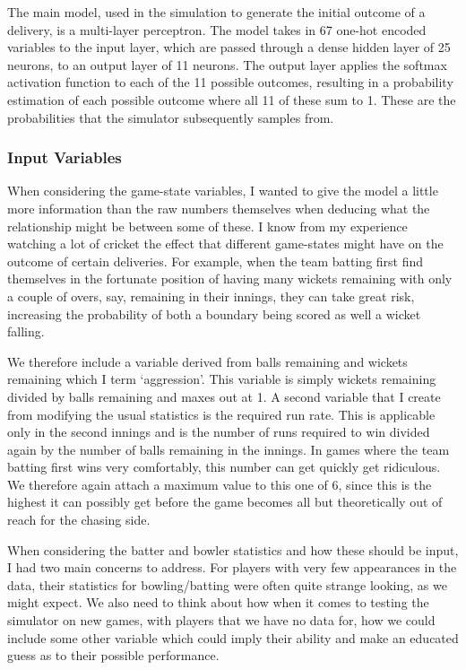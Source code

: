 The main model, used in the simulation to generate the initial outcome of a delivery, is a multi-layer perceptron. The model takes in 67 one-hot encoded variables to the input layer, which are passed through a dense hidden layer of 25 neurons, to an output layer of 11 neurons. The output layer applies the softmax activation function to each of the 11 possible outcomes, resulting in a probability estimation of each possible outcome where all 11 of these sum to 1. These are the probabilities that the simulator subsequently samples from.

\subsubsection{Input Variables}

When considering the game-state variables, I wanted to give the model a little more information than the raw numbers themselves when deducing what the relationship might be between some of these. I know from my experience watching a lot of cricket the effect that different game-states might have on the outcome of certain deliveries. For example, when the team batting first find themselves in the fortunate position of having many wickets remaining with only a couple of overs, say, remaining in their innings, they can take great risk, increasing the probability of both a boundary being scored as well a wicket falling.

We therefore include a variable derived from balls remaining and wickets remaining which I term `aggression'. This variable is simply wickets remaining divided by balls remaining and maxes out at 1. A second variable that I create from modifying the usual statistics is the required run rate. This is applicable only in the second innings and is the number of runs required to win divided again by the number of balls remaining in the innings. In games where the team batting first wins very comfortably, this number can get quickly get ridiculous. We therefore again attach a maximum value to this one of 6, since this is the highest it can possibly get before the game becomes all but theoretically out of reach for the chasing side.

When considering the batter and bowler statistics and how these should be input, I had two main concerns to address. For players with very few appearances in the data, their statistics for bowling/batting were often quite strange looking, as we might expect. We also need to think about how when it comes to testing the simulator on new games, with players that we have no data for, how we could include some other variable which could imply their ability and make an educated guess as to their possible performance.

